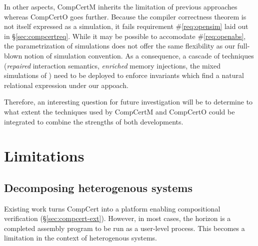\documentclass[11pt,oneside,draft]{book}
\theoremstyle{definition}
\begin{document}
In other aspects,
CompCertM inherits the limitation of previous approaches
whereas CompCertO goes further.
Because the compiler correctness theorem
is not itself expressed as a simulation,
it fails requirement \#\ref{req:opensim}
laid out in \S\ref{sec:compcertreq}.
While it may be possible to accomodate \#\ref{req:openabs},
the parametrization of simulations
does not offer the same flexibility as
our full-blown notion of simulation convention.
As a consequence, a cascade of techniques
(\emph{repaired} interaction semantics,
\emph{enriched} memory injections,
the mixed simulations of \citep{pilsner})
need to be deployed to enforce invariants
which find a natural relational expression
under our appoach.

Therefore,
an interesting question for future investigation
will be to determine to what extent
the techniques used by CompCertM and CompCertO
could be integrated to combine
the strengths of both developments.



\section{Limitations} %

\subsection{Decomposing heterogenous systems} %

Existing work turns CompCert
into a platform enabling compositional verification
(\S\ref{sec:compcert-ext}).
However, in most cases,
the horizon is a completed assembly program to be run as a user-level process.
This becomes a limitation in the context of heterogenous systems.
\end{document}
